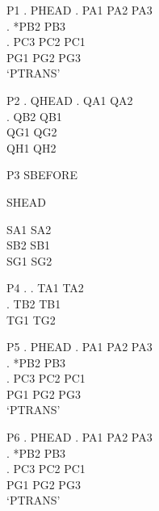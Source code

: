 \begin{frame}{P1}
\ex. PHEAD
\ag. PA1 PA2 PA3 \\
\pause
\bg.\label{p:b} *PB2 {} PB3\\
\pause
\cg. PC3 PC2 PC1\\
\CommonGloss PG1 PG2 PG3\\
\glt `PTRANS'
\end{frame}
\begin{frame}{P2}
\ex. QHEAD
\ag. QA1 QA2\\
\bg. QB2 QB1\\
\CommonGloss QG1 QG2\\
\pause
\CommonGloss QH1 QH2\\
\end{frame}
\begin{frame}{P3}
SBEFORE
\pause
\begin{exe}
\ex SHEAD
\begin{xlist}[CommonGloss]
\ex SA1 SA2\\
\pause
\ex[*] SB2 SB1\\
\CommonGloss SG1 SG2\\
\end{xlist}
\end{exe}
\end{frame}
\begin{frame}{P4}
\ex.
\ag. TA1 TA2\\
\pause
\bg. TB2 TB1\\
\CommonGloss TG1 TG2\\
\end{frame}
\begin{frame}{P5}
\ex. PHEAD
\ag. PA1 PA2 PA3 \\
\bg.\label{p:b5} *PB2 {} PB3\\
\cg. PC3 PC2 PC1\\
\CommonGloss PG1 PG2 PG3\\
\glt `PTRANS'
\end{frame}
\begin{frame}{P6}
\ex. PHEAD
\ag. PA1 PA2 PA3 \\
\bg. *PB2 {} PB3\\
\cg. PC3 PC2 PC1\\
\CommonGloss PG1 PG2 PG3\\
\glt `PTRANS'
\end{frame}

